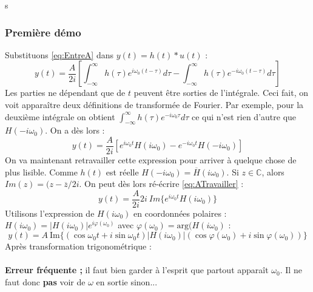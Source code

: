 		s\subsubsection{Première démo}
	Substituons \autoref{eq:EntreA} dans $y(t) = h(t)*u(t)$ :
	\begin{equation}
	y(t) = \dfrac{A}{2i}\left[\int_{-\infty}^\infty h(\tau)e^{i\omega_0(t-\tau)}d\tau-
	\int_{-\infty}^\infty h(\tau)e^{-i\omega_0(t-\tau)}d\tau\right]
	\end{equation}
	Les parties ne dépendant que de $t$ peuvent être sorties de l'intégrale. Ceci fait, 
	on voit apparaître deux définitions de transformée de Fourier. Par exemple, pour la 
	deuxième intégrale on obtient $\int_{-\infty}^\infty h(\tau)e^{-i\omega_0\tau}d\tau$
	ce qui n'est rien d'autre que $H(-i\omega_0)$. On a dès lors :
	\begin{equation}
	y(t) = \dfrac{A}{2i}\left[e^{i\omega_0t}H(i\omega_0)-e^{-i\omega_0t}H(-i\omega_0)
	\right]
	\label{eq:ATravailler}
	\end{equation}
	On va maintenant retravailler cette expression pour arriver à quelque chose de plus 
	lisible. Comme $h(t)$ est réelle $H(-i\omega_0) = \overline{H}(i\omega_0)$. Si $z\in
	\mathbb{C}$, alors $Im(z) = (z-\overline{z}/2i$. On peut dès lors ré-écrire 
	\autoref{eq:ATravailler} :
	\begin{equation}
	y(t) = \frac{A}{2i}2i\ Im\{e^{i\omega_0t}H(i\omega_0)\}
	\end{equation}
	Utilisons l'expression de $H(i\omega_0)$ en coordonnées polaires : $H(i\omega_0) = 
	|H(i\omega_0)|e^{i\varphi(\omega_0)}$ avec $\varphi(\omega_0) = \text{arg}(H(
	i\omega_0)$ :
	\begin{equation}
	y(t) = A\ \text{Im}\{(\cos\omega_0t + i\sin\omega_0t)|H(i\omega_0)|(\cos\varphi(\omega_0)
	+i\sin\varphi(\omega_0))\}
	\end{equation}
	Après transformation trigonométrique :\\
	
	\ \\	
	\textbf{Erreur fréquente ;} il faut bien garder à l'esprit que partout apparaît $\omega_0$.
	Il ne faut donc \textbf{pas} voir de $\omega$ en sortie sinon...
	
	
